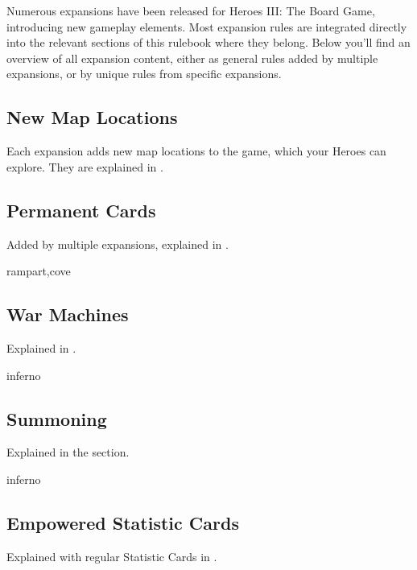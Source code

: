 
\begin{multicols*}{2}

Numerous expansions have been released for Heroes III: The Board Game, introducing new gameplay elements.
Most expansion rules are integrated directly into the relevant sections of this rulebook where they belong.
Below you'll find an overview of all expansion content, either as general rules added by multiple expansions, or by unique rules from specific expansions.

\subsection*{New Map Locations}
Each expansion adds new map locations to the game, which your Heroes can explore.
They are explained in .

\subsection*{Permanent Cards}
Added by multiple expansions, explained in .

\vspace*{1em}
\begin{expansion}{rampart,cove}
\subsection*{War Machines}
  Explained in .
\end{expansion}

\vspace*{1em}
\begin{expansion}{inferno}
\subsection*{Summoning}
  Explained in the  section.
\end{expansion}

\vspace*{1em}
\begin{expansion}{inferno}
\subsection*{Empowered Statistic Cards}
  Explained with regular Statistic Cards in .
\end{expansion}


\end{multicols*}
